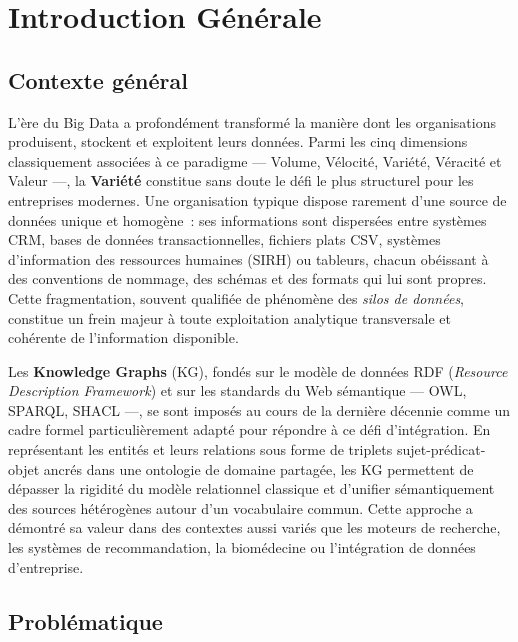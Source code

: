 \chapter*{Introduction Générale}
\label{chap:introduction_generale}
 
\section*{Contexte général}
 
L'ère du Big Data a profondément transformé la manière dont les
organisations produisent, stockent et exploitent leurs données.
Parmi les cinq dimensions classiquement associées à ce paradigme —
Volume, Vélocité, Variété, Véracité et Valeur —, la \textbf{Variété}
constitue sans doute le défi le plus structurel pour les entreprises
modernes. Une organisation typique dispose rarement d'une source de
données unique et homogène~: ses informations sont dispersées entre
systèmes CRM, bases de données transactionnelles, fichiers plats
CSV, systèmes d'information des ressources humaines (SIRH) ou
tableurs, chacun obéissant à des conventions de nommage, des schémas
et des formats qui lui sont propres. Cette fragmentation, souvent
qualifiée de phénomène des \textit{silos de données}, constitue un
frein majeur à toute exploitation analytique transversale et
cohérente de l'information disponible.
 
Les \textbf{Knowledge Graphs} (KG), fondés sur le modèle de données
RDF (\textit{Resource Description Framework}) et sur les standards du
Web sémantique — OWL, SPARQL, SHACL —, se sont imposés au cours de la
dernière décennie comme un cadre formel particulièrement adapté pour
répondre à ce défi d'intégration. En représentant les entités et
leurs relations sous forme de triplets sujet-prédicat-objet ancrés
dans une ontologie de domaine partagée, les KG permettent de dépasser
la rigidité du modèle relationnel classique et d'unifier
sémantiquement des sources hétérogènes autour d'un vocabulaire
commun. Cette approche a démontré sa valeur dans des contextes aussi
variés que les moteurs de recherche, les systèmes de recommandation,
la biomédecine ou l'intégration de données d'entreprise.
 
\section*{Problématique}
 
